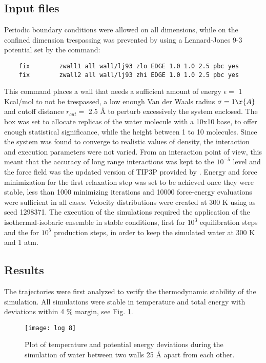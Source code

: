 \documentclass[
	12pt, %
]{fphw}
\begin{document}
\subsection{Input files}
Periodic boundary conditions were allowed on all dimensions, while on the confined dimension trespassing was prevented by using a Lennard-Jones 9-3 potential set by the command:
\begin{verbatim}	
	fix	       zwall1 all wall/lj93 zlo EDGE 1.0 1.0 2.5 pbc yes
	fix	       zwall2 all wall/lj93 zhi EDGE 1.0 1.0 2.5 pbc yes
\end{verbatim}
This command places a wall that needs a sufficient amount of energy $\epsilon =$ 1 Kcal/mol to not be trespassed, a low enough  Van der Waals radius $\sigma = 1 \r{A}$ and cutoff distance $r_{cut} =$ 2.5 \r{A} to perturb excessively the system enclosed.
The box was set to allocate replicas of the water molecule with a 10x10 base, to offer enough statistical significance, while the height between 1 to 10 molecules.
Since the system was found to converge to realistic values of density, the interaction and execution parameters were not varied.
From an interaction point of view, this meant that the accuracy of long range interactions was kept to the $10^{-5}$ level and the force field was the updated version of TIP3P provided by \citet{price_modified_2004}.
Energy and force minimization for the first relaxation step was set to be achieved once they were stable, less than 1000 minimizing iterations and 10000 force-energy evaluations were sufficient  in all cases.
Velocity distributions were created at 300 K using as seed 1298371.
The execution of the simulations required the application of the isothermal-isobaric ensemble in stable conditions, first for $10^{3}$ equilibration steps and the for $10^{5}$ production steps, in order to keep the simulated water at 300 K and 1 atm.

\subsection{Results}
The trajectories were first analyzed to verify the thermodynamic stability of the simulation. 
All simulations were stable in temperature and total energy with deviations within 4 \% margin, see Fig. \ref{log}.\\

\begin{figure}[h!]
	\centering
	\texttt{[image: log 8]}
	\caption{Plot of temperature and potential energy deviations during the simulation of water between two walls 25 \r{A} apart from each other.}
	\label{log}
\end{figure}
\end{document}
